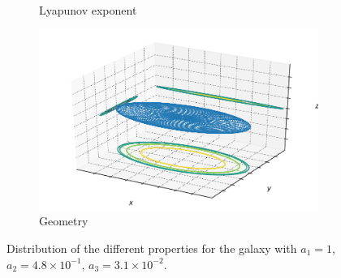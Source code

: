\begin{figure}[h]
\begin{subfigure}[t]{0.4\textwidth}
        \caption{Lyapunov exponent}
    \end{subfigure}
    \begin{subfigure}[t]{0.4\textwidth}
        \includegraphics[width=\textwidth]{"../Files/Week 13/images/1_ellipsoid"}
        \caption{Geometry}
    \end{subfigure}
    \caption{Distribution of the different properties for the galaxy with $a_1 = 1$, $a_2 = 4.8\times10^{-1}$, $a_3 = 3.1\times10^{-2}$.}
    \label{fig: g9}
\end{figure}



